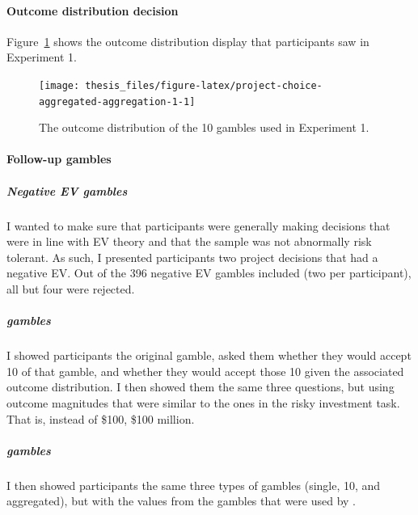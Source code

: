 \documentclass[a4paper, nobind, dvipsnames]{templates/ociamthesis}
\theoremstyle{definition}
\theoremstyle{definition}
\theoremstyle{definition}
\theoremstyle{definition}
\theoremstyle{remark}
\begin{document}
\hypertarget{outcome-distribution-materials-aggregation-1-appendix}{%
\paragraph{Outcome distribution decision}\label{outcome-distribution-materials-aggregation-1-appendix}}

Figure~\ref{fig:project-choice-aggregated-aggregation-1} shows the outcome
distribution display that participants saw in Experiment 1.



\begin{figure}
\texttt{[image: thesis\_files/figure-latex/project-choice-aggregated-aggregation-1-1]} \caption{The outcome distribution of the 10 gambles used in Experiment 1.}\label{fig:project-choice-aggregated-aggregation-1}
\end{figure}

\hypertarget{follow-up-materials-aggregation-1-appendix}{%
\paragraph{Follow-up gambles}\label{follow-up-materials-aggregation-1-appendix}}

\subparagraph{Negative EV gambles}

I wanted to make sure that participants were generally making decisions that
were in line with EV theory and that the sample was not abnormally risk
tolerant. As such, I presented participants two project decisions that had a
negative EV. Out of the 396 negative EV
gambles included (two per participant), all but
four were rejected.

\subparagraph{\texorpdfstring{\textcite{samuelson1963} gambles}{Samuelson (1963) gambles}}

I showed participants the original \textcite{samuelson1963} gamble, asked them whether
they would accept 10 of that gamble, and whether they would accept those 10
given the associated outcome distribution. I then showed them the same three
questions, but using outcome magnitudes that were similar to the ones in the
risky investment task. That is, instead of \$100, \$100 million.

\subparagraph{\texorpdfstring{\textcite{redelmeier1992} gambles}{Redelmeier \& Tversky (1992) gambles}}

I then showed participants the same three types of gambles (single, 10, and
aggregated), but with the values from the gambles that were used by
\textcite{redelmeier1992}.
\end{document}

